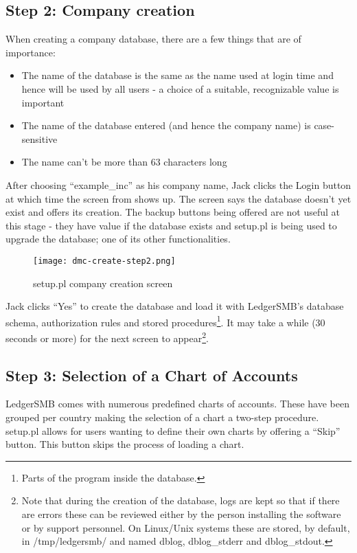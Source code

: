 \subsection{Step 2: Company creation}

When creating a company database, there are a few things that are of importance:

\begin{itemize}
\item The name of the database is the same as the name used at login time and hence
   will be used by all users - a choice of a suitable, recognizable value is important
\item The name of the database entered (and hence the company name) is case-sensitive
\item The name can't be more than 63 characters long
\end{itemize}

After choosing ``example\_inc'' as his company name, Jack clicks the Login button at which
time the screen from  shows up. The screen says the database doesn't
yet exist and offers its creation. The backup buttons being offered are not useful at this
stage - they have value if the database exists and setup.pl is being used to upgrade
the database; one of its other functionalities.

\begin{figure}[h]
\centering
\texttt{[image: dmc-create-step2.png]}
\caption{setup.pl company creation screen}
\label{fig:setup-step2}
\end{figure}

Jack clicks ``Yes'' to create the database and load it with LedgerSMB's database
schema, authorization rules and stored
procedures\footnote{Parts of the program inside the database.}. It may
take a while (30 seconds or more) for the next screen to appear\footnote{Note 
that during the creation of the database, logs are kept so that if there are
errors these can be reviewed either by the person installing the software or by
support personnel.  On Linux/Unix systems these are stored, by default, in
/tmp/ledgersmb/ and named dblog, dblog\_stderr and dblog\_stdout.}.

\subsection{Step 3: Selection of a Chart of Accounts}

LedgerSMB comes with numerous predefined charts of accounts. These have been grouped
per country making the selection of a chart a two-step procedure. setup.pl allows for
users wanting to define their own charts by offering a ``Skip'' button. This button
skips the process of loading a chart.

